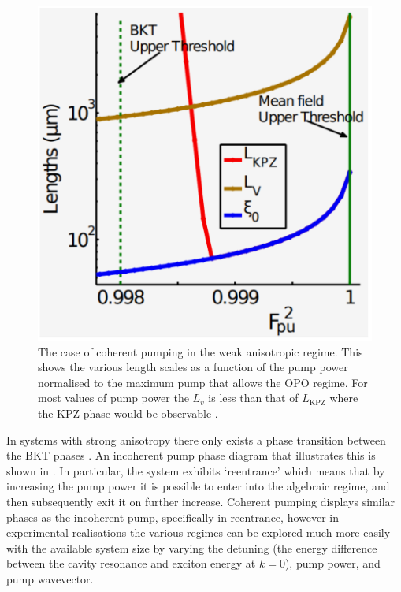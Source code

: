 \begin{figure}[htbp!]
	\centering
	\includegraphics[scale=0.4]{coherentwa.pdf}
	\caption{The case of coherent pumping in the weak anisotropic regime. This shows the various length scales as a function of the pump power normalised to the maximum pump that allows the OPO regime. For most values of pump power the $L_v$ is less than that of $L_{\textrm{KPZ}}$ where the KPZ phase would be observable \cite{PhysRevX.5.041028}.}
	\label{fig:coherentwa}
\end{figure}
In systems with strong anisotropy there only exists a phase transition between the BKT phases \cite{2015PhRvX...5a1017A, PhysRevX.5.041028}. An incoherent pump phase diagram that illustrates this is shown in . In particular, the system exhibits ‘reentrance’ which means that by increasing the pump power it is possible to enter into the algebraic regime, and then subsequently exit it on further increase. Coherent pumping displays similar phases as the incoherent pump, specifically in reentrance, however in experimental realisations the various regimes can be explored much more easily with the available system size by varying the detuning (the energy difference between the cavity resonance and exciton energy at $k=0$), pump power, and pump wavevector. 

